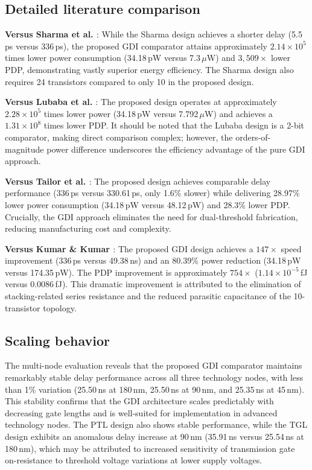 \documentclass[final,5p,times,twocolumn]{elsarticle}
\begin{document}
\subsection{Detailed literature comparison}

\textbf{Versus Sharma et al. \cite{sharma2025}}: While the Sharma design achieves a shorter delay (5.5\,ps versus 336\,ps), the proposed GDI comparator attains approximately $2.14 \times 10^5$ times lower power consumption (34.18\,pW versus 7.3\,$\mu$W) and $3{,}509\times$ lower PDP, demonstrating vastly superior energy efficiency. The Sharma design also requires 24 transistors compared to only 10 in the proposed design.

\textbf{Versus Lubaba et al. \cite{lubaba2020}}: The proposed design operates at approximately $2.28 \times 10^5$ times lower power (34.18\,pW versus 7.792\,$\mu$W) and achieves a $1.31 \times 10^8$ times lower PDP. It should be noted that the Lubaba design is a 2-bit comparator, making direct comparison complex; however, the orders-of-magnitude power difference underscores the efficiency advantage of the pure GDI approach.

\textbf{Versus Tailor et al. \cite{tailor2019}}: The proposed design achieves comparable delay performance (336\,ps versus 330.61\,ps, only 1.6\% slower) while delivering 28.97\% lower power consumption (34.18\,pW versus 48.12\,pW) and 28.3\% lower PDP. Crucially, the GDI approach eliminates the need for dual-threshold fabrication, reducing manufacturing cost and complexity.

\textbf{Versus Kumar \& Kumar \cite{kumar2017}}: The proposed GDI design achieves a $147\times$ speed improvement (336\,ps versus 49.38\,ns) and an 80.39\% power reduction (34.18\,pW versus 174.35\,pW). The PDP improvement is approximately $754\times$ ($1.14 \times 10^{-5}$\,fJ versus 0.0086\,fJ). This dramatic improvement is attributed to the elimination of stacking-related series resistance and the reduced parasitic capacitance of the 10-transistor topology.

\subsection{Scaling behavior}

The multi-node evaluation reveals that the proposed GDI comparator maintains remarkably stable delay performance across all three technology nodes, with less than 1\% variation (25.50\,ns at 180\,nm, 25.50\,ns at 90\,nm, and 25.35\,ns at 45\,nm). This stability confirms that the GDI architecture scales predictably with decreasing gate lengths and is well-suited for implementation in advanced technology nodes. The PTL design also shows stable performance, while the TGL design exhibits an anomalous delay increase at 90\,nm (35.91\,ns versus 25.54\,ns at 180\,nm), which may be attributed to increased sensitivity of transmission gate on-resistance to threshold voltage variations at lower supply voltages.
\end{document}
